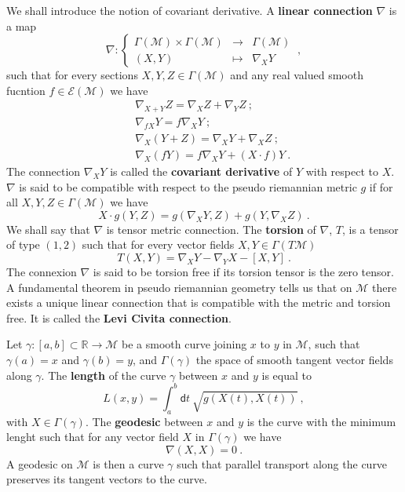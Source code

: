 \documentclass[12pt]{book}
\let\int\int
\newcommand{\Ecal}{\mathcal{E}}
\newcommand{\Mcal}{\mathcal{M}}
\newcommand{\Rbb}{\mathbb{R}}
\newcommand{\dsf}{\mathsf{d}}
\theoremstyle{break}
\begin{document}
We shall introduce the notion of covariant derivative. A \textbf{linear connection} $\nabla$ is a map 
%
\begin{equation*}
\nabla : \left\{
\begin{array}{ccl}
\Gamma(\Mcal) \times \Gamma(\Mcal) & \to & \Gamma(\Mcal) \\
(X,Y) & \mapsto & \nabla_X Y 
\end{array}
\right. \ ,
\end{equation*}
%
such that for every sections $X, Y, Z \in \Gamma(\Mcal)$ and any real valued smooth fucntion $f \in \Ecal(\Mcal)$ we have
%
\begin{eqnarray*}
&& \nabla_{X + Y} Z = \nabla_X Z + \nabla_Y Z \ ; \\ 
&& \nabla_{f X} Y = f \nabla_X Y \ ;\\
&& \nabla_X(Y+Z) = \nabla_X Y + \nabla_X Z \ ;\\
&& \nabla_X(fY) = f \nabla_X Y + (X \cdot f) Y \ .
\end{eqnarray*}
%
The connection $\nabla_X Y$ is called the \textbf{covariant derivative} of $Y$ with respect to $X$. $\nabla$ is said to be compatible with respect to the pseudo riemannian metric $g$ if for all $X, Y, Z \in \Gamma(\Mcal)$ we have
%
\begin{equation*}
X \cdot g(Y,Z) = g(\nabla_X Y, Z) + g(Y,\nabla_X Z) \ .
\end{equation*}
%
We shall say that $\nabla$ is tensor metric connection. The \textbf{torsion} of $\nabla$, $T$, is a tensor of type $(1,2)$ such that for every vector fields $X, Y \in \Gamma(T\Mcal)$ 
%
\begin{equation*}
T(X,Y) = \nabla_X Y - \nabla_Y X - \left[ X,Y\right] \ .
\end{equation*}
%
The connexion $\nabla$ is said to be torsion free if its torsion tensor is the zero tensor. A fundamental theorem in pseudo riemannian geometry tells us that on $\Mcal$ there exists a unique linear connection that is compatible with the metric and torsion free. It is called the \textbf{Levi Civita connection}.




Let $\gamma : [a,b] \subset \Rbb \to \Mcal$ be a smooth curve joining $x$ to $y$ in $\Mcal$, such that $\gamma(a)=x$ and $\gamma(b)=y$, and $\Gamma(\gamma)$ the space of smooth tangent vector fields along $\gamma$. The \textbf{length} of the curve $\gamma$ between $x$ and $y$ is equal to
%
\begin{equation*}
L(x,y) = \int_a^b \dsf t \  \sqrt{g\left(X(t),X(t)\right)} \ ,
\end{equation*}
%
with $X \in \Gamma(\gamma)$. The \textbf{geodesic} between $x$ and $y$ is the curve with the minimum lenght such that for any vector field $X$ in $\Gamma(\gamma)$ we have
%
\begin{equation*}
\nabla(X,X) = 0 \ .
\end{equation*}
%
A geodesic on $\Mcal$ is then a curve $\gamma$ such that parallel transport along the curve preserves its tangent vectors to the curve.
\end{document}
